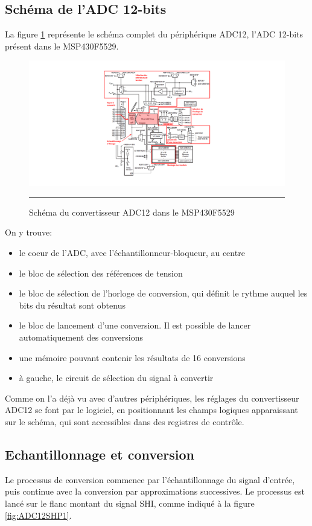 \subsection{Schéma de l'ADC 12-bits}
La figure \ref{fig:ADC_Schema} représente le schéma complet du périphérique ADC12, l'ADC 12-bits présent dans le MSP430F5529. 

\begin{figure}[H]
  \centering
  \includegraphics [angle=0, width=16cm]{./Figures/Chap11_ADC/ADC_Schema.pdf}
  \rule{35em}{0.5pt}
  \caption{Schéma du convertisseur ADC12 dans le MSP430F5529}
  \label{fig:ADC_Schema}
\end{figure}

On y trouve:
\begin{itemize}[label=\textbullet,font=\small]
  \item le coeur de l'ADC, avec l'échantillonneur-bloqueur, au centre
  \item le bloc de sélection des références de tension
  \item le bloc de sélection de l'horloge de conversion, qui définit le rythme auquel les bits du résultat sont obtenus
  \item le bloc de lancement d'une conversion. Il est possible de lancer automatiquement des conversions
  \item une mémoire pouvant contenir les résultats de 16 conversions
  \item à gauche, le circuit de sélection du signal à convertir
\end{itemize}

Comme on l'a déjà vu avec d'autres périphériques, les réglages du convertisseur ADC12 se font par le logiciel, en positionnant les champs logiques apparaissant sur le schéma, qui sont accessibles dans des registres de contrôle.

\pagebreak
\subsection{Echantillonnage et conversion}
Le processus de conversion commence par l'échantillonnage du signal d'entrée, puis continue avec la conversion par approximations successives. Le processus est lancé sur le flanc montant du signal SHI, comme indiqué à la figure \ref{fig:ADC12SHP1}.

